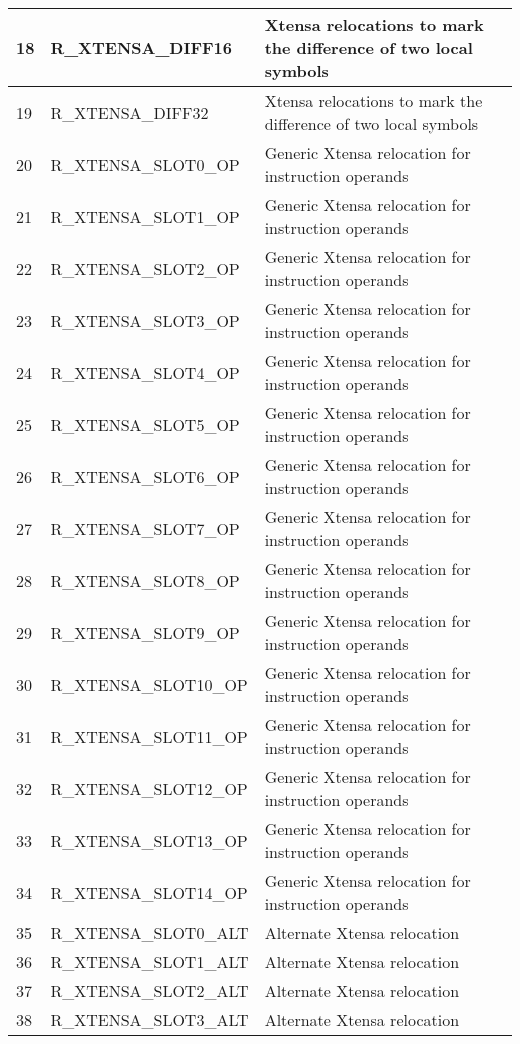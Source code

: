 \begin{smalltables}
\begin{longtable}{|p{1cm}|p{6cm}|p{10cm}|}
	18 & R\_XTENSA\_DIFF16 & Xtensa relocations to mark the difference of two local symbols \\ \hline
	19 & R\_XTENSA\_DIFF32 & Xtensa relocations to mark the difference of two local symbols \\ \hline
	20 & R\_XTENSA\_SLOT0\_OP & Generic Xtensa relocation for instruction operands\\ \hline
	21 & R\_XTENSA\_SLOT1\_OP & Generic Xtensa relocation for instruction operands\\ \hline
	22 & R\_XTENSA\_SLOT2\_OP & Generic Xtensa relocation for instruction operands\\ \hline
	23 & R\_XTENSA\_SLOT3\_OP & Generic Xtensa relocation for instruction operands\\ \hline
	24 & R\_XTENSA\_SLOT4\_OP & Generic Xtensa relocation for instruction operands\\ \hline
	25 & R\_XTENSA\_SLOT5\_OP & Generic Xtensa relocation for instruction operands\\ \hline
	26 & R\_XTENSA\_SLOT6\_OP & Generic Xtensa relocation for instruction operands\\ \hline
	27 & R\_XTENSA\_SLOT7\_OP & Generic Xtensa relocation for instruction operands\\ \hline
	28 & R\_XTENSA\_SLOT8\_OP & Generic Xtensa relocation for instruction operands\\ \hline
	29 & R\_XTENSA\_SLOT9\_OP & Generic Xtensa relocation for instruction operands\\ \hline
	30 & R\_XTENSA\_SLOT10\_OP & Generic Xtensa relocation for instruction operands\\ \hline
	31 & R\_XTENSA\_SLOT11\_OP & Generic Xtensa relocation for instruction operands\\ \hline
	32 & R\_XTENSA\_SLOT12\_OP & Generic Xtensa relocation for instruction operands\\ \hline
	33 & R\_XTENSA\_SLOT13\_OP & Generic Xtensa relocation for instruction operands\\ \hline
	34 & R\_XTENSA\_SLOT14\_OP & Generic Xtensa relocation for instruction operands\\ \hline
	35 & R\_XTENSA\_SLOT0\_ALT & Alternate Xtensa relocation \\ \hline
	36 & R\_XTENSA\_SLOT1\_ALT & Alternate Xtensa relocation \\ \hline
	37 & R\_XTENSA\_SLOT2\_ALT & Alternate Xtensa relocation \\ \hline
	38 & R\_XTENSA\_SLOT3\_ALT & Alternate Xtensa relocation \\ \hline

\end{longtable}
\end{smalltables}
